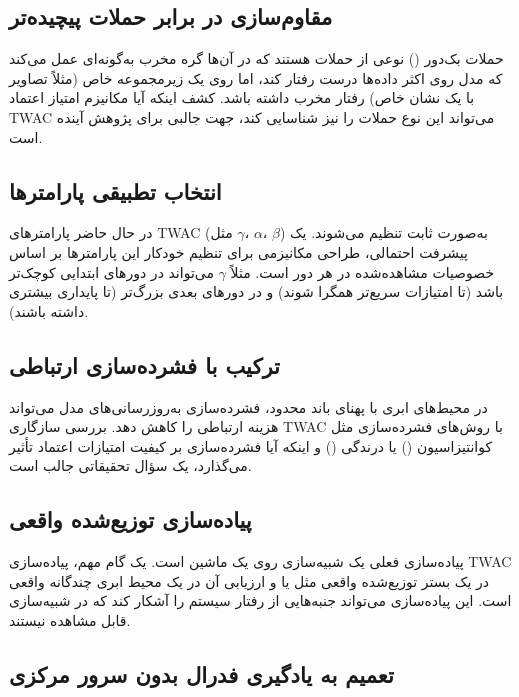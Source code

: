 \subsection{مقاوم‌سازی در برابر حملات پیچیده‌تر}

حملات بک‌دور () \cite{bagdasaryan2020backdoor} نوعی از حملات هستند که در آن‌ها گره مخرب به‌گونه‌ای عمل می‌کند که مدل روی اکثر داده‌ها درست رفتار کند، اما روی یک زیرمجموعه خاص (مثلاً تصاویر با یک نشان خاص) رفتار مخرب داشته باشد. کشف اینکه آیا مکانیزم امتیاز اعتماد \gls{TWAC} می‌تواند این نوع حملات را نیز شناسایی کند، جهت جالبی برای پژوهش آینده است.

\subsection{انتخاب تطبیقی پارامترها}

در حال حاضر پارامترهای \gls{TWAC} (مثل $\gamma$، $\alpha$، $\beta$) به‌صورت ثابت تنظیم می‌شوند. یک پیشرفت احتمالی، طراحی مکانیزمی برای تنظیم خودکار این پارامترها بر اساس خصوصیات مشاهده‌شده در هر دور است. مثلاً $\gamma$ می‌تواند در دورهای ابتدایی کوچک‌تر باشد (تا امتیازات سریع‌تر همگرا شوند) و در دورهای بعدی بزرگ‌تر (تا پایداری بیشتری داشته باشند).

\subsection{ترکیب با فشرده‌سازی ارتباطی}

در محیط‌های ابری با پهنای باند محدود، فشرده‌سازی به‌روزرسانی‌های مدل می‌تواند هزینه ارتباطی را کاهش دهد. بررسی سازگاری \gls{TWAC} با روش‌های فشرده‌سازی مثل کوانتیزاسیون () یا درندگی () و اینکه آیا فشرده‌سازی بر کیفیت امتیازات اعتماد تأثیر می‌گذارد، یک سؤال تحقیقاتی جالب است.

\subsection{پیاده‌سازی توزیع‌شده واقعی}

پیاده‌سازی فعلی یک شبیه‌سازی روی یک ماشین است. یک گام مهم، پیاده‌سازی \gls{TWAC} در یک بستر توزیع‌شده واقعی مثل  یا  و ارزیابی آن در یک محیط ابری چندگانه واقعی است. این پیاده‌سازی می‌تواند جنبه‌هایی از رفتار سیستم را آشکار کند که در شبیه‌سازی قابل مشاهده نیستند.

\subsection{تعمیم به یادگیری فدرال بدون سرور مرکزی}

